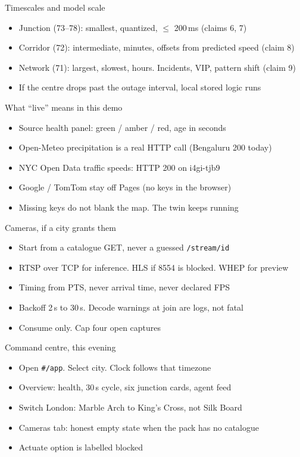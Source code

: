\documentclass[aspectratio=169,11pt]{beamer}
\begin{document}
\begin{frame}{Timescales and model scale}
\begin{itemize}\itemsep0.7em
\item Junction (73--78): smallest, quantized, $\le$ 200\,ms (claims 6, 7)
\item Corridor (72): intermediate, minutes, offsets from predicted speed
      (claim 8)
\item Network (71): largest, slowest, hours. Incidents, VIP, pattern shift
      (claim 9)
\item If the centre drops past the outage interval, local stored logic runs
\end{itemize}
\end{frame}

\begin{frame}{What ``live'' means in this demo}
\begin{itemize}\itemsep0.7em
\item Source health panel: green / amber / red, age in seconds
\item Open-Meteo precipitation is a real HTTP call (Bengaluru 200 today)
\item NYC Open Data traffic speeds: HTTP 200 on i4gi-tjb9
\item Google / TomTom stay off Pages (no keys in the browser)
\item Missing keys do not blank the map. The twin keeps running
\end{itemize}
\end{frame}

\begin{frame}{Cameras, if a city grants them}
\begin{itemize}\itemsep0.7em
\item Start from a catalogue GET, never a guessed \texttt{/stream/id}
\item RTSP over TCP for inference. HLS if 8554 is blocked. WHEP for preview
\item Timing from PTS, never arrival time, never declared FPS
\item Backoff 2\,s to 30\,s. Decode warnings at join are logs, not fatal
\item Consume only. Cap four open captures
\end{itemize}
\end{frame}

\begin{frame}{Command centre, this evening}
\begin{itemize}\itemsep0.7em
\item Open \texttt{\#/app}. Select city. Clock follows that timezone
\item Overview: health, 30\,s cycle, six junction cards, agent feed
\item Switch London: Marble Arch to King's Cross, not Silk Board
\item Cameras tab: honest empty state when the pack has no catalogue
\item Actuate option is labelled blocked
\end{itemize}
\end{frame}
\end{document}
